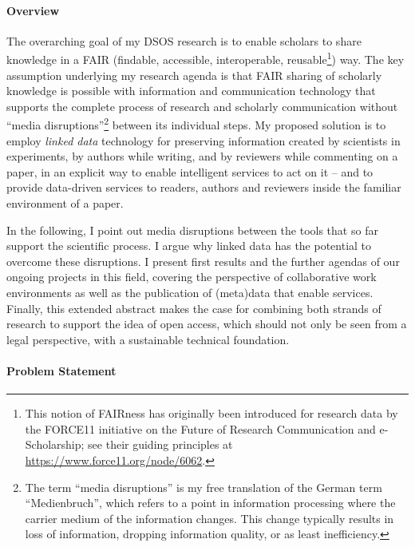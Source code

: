\documentclass[a4paper,USenglish]{dagrep}
\begin{document}
\paragraph*{Overview}

The overarching goal of my DSOS research is to enable scholars to share
knowledge in a FAIR (findable, accessible, interoperable, reusable\footnote{%
This notion of FAIRness has originally been introduced for research data by the
FORCE11 initiative on the Future of Research Communication and e-Scholarship;
see their guiding principles at \url{https://www.force11.org/node/6062}.%
}) way.
The key assumption underlying my research agenda is that FAIR sharing of
scholarly knowledge is possible with information and communication technology
that supports the complete process of research and scholarly communication
without ``media disruptions''\footnote{%
The term ``media disruptions'' is my free translation of the German term
``Medienbruch'', which refers to a point in information processing where the
carrier medium of the information changes.
This change typically results in loss of information, dropping information
quality, or as least inefficiency.%
} between its individual steps.
My proposed solution is to employ \emph{linked data} technology for preserving
information created by scientists in experiments, by authors while writing, and
by reviewers while commenting on a paper, in an explicit way to enable
intelligent services to act on it – and to provide data-driven services to
readers, authors and reviewers inside the familiar environment of a paper.

In the following, I point out media disruptions between the tools that so far
support the scientific process.
I argue why linked data has the potential to overcome these disruptions.
I present first results and the further agendas of our ongoing projects in this
field, covering the perspective of collaborative work environments as well as
the publication of (meta)data that enable services.
Finally, this extended abstract makes the case for combining both strands of
research to support the idea of open access, which should not only be seen from
a legal perspective, with a sustainable technical foundation.

\paragraph*{Problem Statement}
\end{document}
